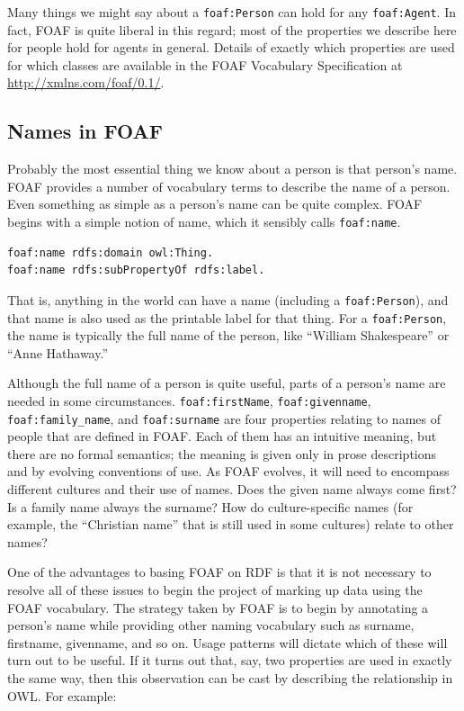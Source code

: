 Many things we might say about a \texttt{foaf:Person} can hold for any
\texttt{foaf:Agent}. In fact, FOAF is quite liberal in this regard; most of the
properties we describe here for people hold for agents in general.
Details of exactly which properties are used for which classes are
available in the FOAF Vocabulary Specification at
\url{http://xmlns.com/foaf/0.1/}.

\subsection{Names in FOAF}

Probably the most essential thing we know about a person is that
person's name. FOAF provides a number of vocabulary terms to describe
the name of a person. Even something as simple as a person's name can be
quite complex. FOAF begins with a simple notion of name, which it
sensibly calls \texttt{foaf:name}.

\begin{lstlisting}
foaf:name rdfs:domain owl:Thing.
foaf:name rdfs:subPropertyOf rdfs:label.
\end{lstlisting}

That is, anything in the world can have a name (including a
\texttt{foaf:Person}), and that name is also used as the printable label for that
thing. For a \texttt{foaf:Person}, the name is typically the full name of the
person, like ``William Shakespeare'' or ``Anne Hathaway.''

Although the full name of a person is quite useful, parts of a person's
name are needed in some circumstances. \texttt{foaf:firstName}, \texttt{foaf:givenname},
\texttt{foaf:family\_name}, and \texttt{foaf:surname} are four properties relating to
names of people that are defined in FOAF. Each of
them has an intuitive meaning, but there are no formal semantics; the
meaning is given only in prose descriptions and by evolving conventions
of use. As FOAF evolves, it will need to encompass different cultures
and their use of names. Does the given name always come first? Is a
family name always the surname? How do culture-specific names (for
example, the ``Christian name'' that is still used in some cultures)
relate to other names?

One of the advantages to basing FOAF on RDF is that it is not necessary
to resolve all of these issues to begin the project of marking up data
using the FOAF vocabulary. The strategy taken by FOAF is to begin by
annotating a person's name while providing other naming vocabulary such
as surname, firstname, givenname, and so on. Usage patterns will dictate
which of these will turn out to be useful. If it turns out that, say,
two properties are used in exactly the same way, then this observation
can be cast by describing the relationship in OWL. For example:

